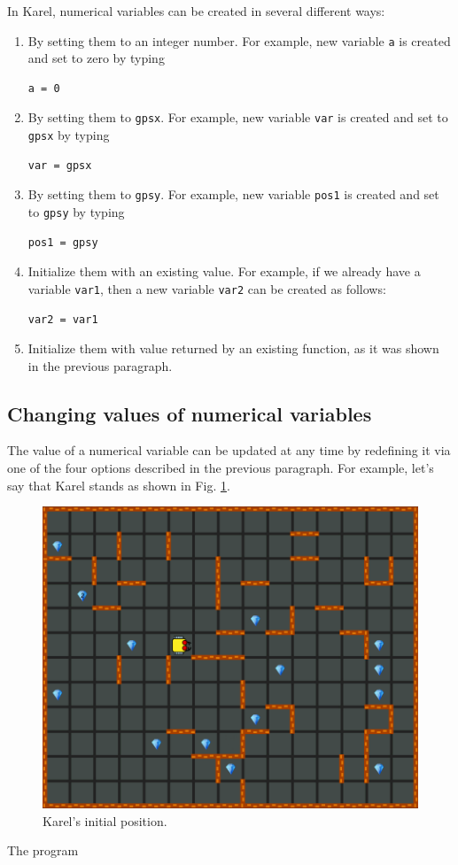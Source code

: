 In Karel, numerical variables can be created in several different ways: 
\begin{enumerate}
\item By setting them to an integer number. For example, new variable {\tt a} is created and set to zero by typing 
\begin{verbatim}
a = 0
\end{verbatim}
\item By setting them to {\tt gpsx}. For example, new variable {\tt var} is created and set to {\tt gpsx} by typing
\begin{verbatim}
var = gpsx
\end{verbatim}
\item By setting them to {\tt gpsy}. For example, new variable {\tt pos1} is created and set to {\tt gpsy} by typing
\begin{verbatim}
pos1 = gpsy
\end{verbatim}
\item Initialize them with an existing value. For example, if we already have a variable {\tt var1}, then a new variable 
{\tt var2} can be created as follows:
\begin{verbatim}
var2 = var1
\end{verbatim}
\item Initialize them with value returned by an existing function, as it was shown in the previous 
paragraph. 
\end{enumerate}

\subsection{Changing values of numerical variables}

The value of a numerical variable can be updated at any time by redefining it via 
one of the four options described in the previous paragraph. For example, let's say that 
Karel stands as shown in Fig. \ref{fig:var1}.
\begin{figure}[!ht]
\begin{center}
\includegraphics[height=0.4\textwidth]{imgk/variables1.png}
\end{center}
\vspace{-4mm}
\caption{Karel's initial position.}
\label{fig:var1}
\end{figure}
\noindent
The program

